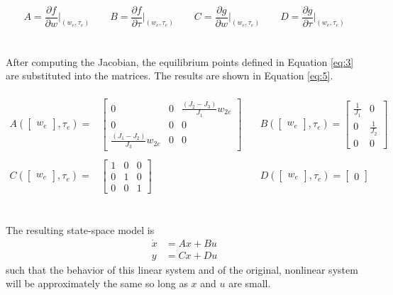 \documentclass[12pt]{article}
\begin{document}
\begin{equation}
\label{eq:4} 
A = \frac{\partial f}{\partial w}\biggr\rvert_{(w_{e},\tau_{e})}
\qquad
B = \frac{\partial f}{\partial \tau}\biggr\rvert_{(w_{e},\tau_{e})}
\qquad
C = \frac{\partial g}{\partial w}\biggr\rvert_{(w_{e},\tau_{e})}
\qquad
D = \frac{\partial g}{\partial \tau}\biggr\rvert_{(w_{e},\tau_{e})}
\end{equation}\
\\ \\
After computing the Jacobian, the equilibrium points defined in Equation \ref{eq:3} are substituted into the matrices. The results are shown in Equation \ref{eq:5}. \\ \\
\begin{equation}
\begin{aligned}
\label{eq:5} 
A {\left(\begin{bmatrix} {w}_{e} \end{bmatrix}, \tau_{e}\right)} = &
\begin{bmatrix} 0 &  0 &  \frac{(J_{2}-J_{3})}{J_{1}}{w}_{2e} \\ 0 & 0 & 0 \\ \frac{(J_{1}-J_{2})}{J_{3}}{w}_{2e} &  0 & 0 \end{bmatrix}
& \quad
B {\left(\begin{bmatrix} {w}_{e} \end{bmatrix}, \tau_{e}\right)} = 
\begin{bmatrix} \frac{1}{J_{1}} & 0 \\ 0 & \frac{1}{J_{2}} \\ 0 & 0 \end{bmatrix}
\\ \\
C {\left(\begin{bmatrix} {w}_{e}\end{bmatrix}, \tau_{e}\right)} = &
\begin{bmatrix} 1 & 0 & 0 \\ 0 & 1 & 0 \\ 0 & 0 & 1   \end{bmatrix}
& \quad
D {\left(\begin{bmatrix} {w}_{e}\end{bmatrix}, \tau_{e}\right)} = 
\begin{bmatrix} 0 \end{bmatrix}
\end{aligned}
\end{equation}
\\ \\
The resulting state-space model is
\begin{align*}
\dot{x} &= Ax+Bu \\
y &= Cx+Du
\end{align*}
such that the behavior of this linear system and of the original, nonlinear system will be approximately the same so long as $x$ and $u$ are small. 
\end{document}
